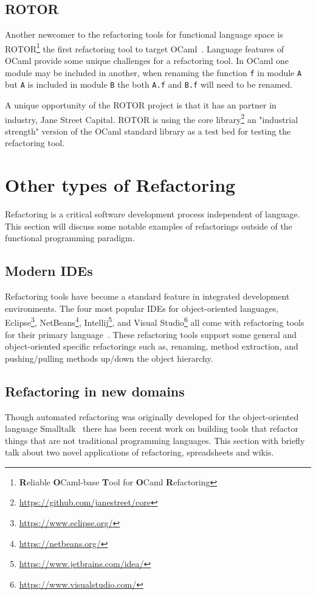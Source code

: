 \subsection{ROTOR}

Another newcomer to the refactoring tools for functional language space is ROTOR\footnote{\textbf{R}eliable \textbf{O}Caml-base \textbf{T}ool for \textbf{O}Caml \textbf{R}efactoring} the first refactoring tool to target OCaml~\citep{rotor}. Language features of OCaml provide some unique challenges for a refactoring tool. In OCaml one module may be included in another, when renaming the function \texttt{f} in module \texttt{A} but \texttt{A} is included in module \texttt{B} the both \texttt{A.f} and \texttt{B.f} will need to be renamed. 

A unique opportunity of the ROTOR project is that it has an partner in industry, Jane Street Capital. ROTOR is using the core library\footnote{\url{https://github.com/janestreet/core}} an "industrial strength" version of the OCaml standard library as a test bed for testing the refactoring tool.
 
\section{Other types of Refactoring}\label{otherTools}

Refactoring is a critical software development process independent of language. This section will discuss some notable examples of refactorings outside of the functional programming paradigm. 


\subsection{Modern IDEs}
Refactoring tools have become a standard feature in integrated development environments. The four most popular IDEs for object-oriented languages, Eclipse\footnote{\url{https://www.eclipse.org/}}, NetBeans\footnote{\url{https://netbeans.org/}}, Intellij\footnote{\url{https://www.jetbrains.com/idea/}}, and Visual Studio\footnote{\url{https://www.visualstudio.com/}} all come with refactoring tools for their primary language~\citep{ides}. These refactoring tools support some general and object-oriented specific refactorings such as, renaming, method extraction, and pushing/pulling methods up/down the object hierarchy.  

\subsection{Refactoring in new domains}
Though automated refactoring was originally developed for the object-oriented language Smalltalk~\citep{refactoringBrowser} there has been recent work on building tools that refactor things that are not traditional programming languages. This section with briefly talk about two novel applications of refactoring, spreadsheets and wikis.


